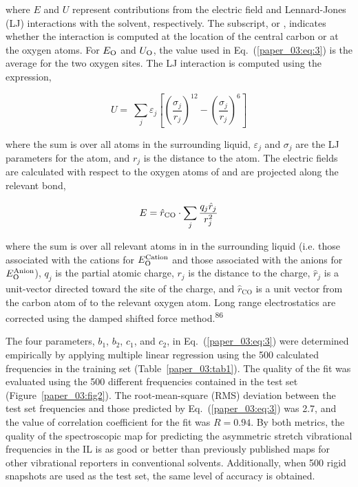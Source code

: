 \documentclass[]{article}
\begin{document}
where \(E\) and \(U\) represent contributions from the electric field and Lennard-Jones (LJ) interactions with the solvent, respectively. The subscript,  or , indicates whether the interaction is computed at the location of the  central carbon or at the oxygen atoms. For \(E_{\ce{O}}\) and \(U_{\ce{O}}\), the value used in Eq.~(\ref{paper_03:eq:3}) is the average for the two  oxygen sites. The LJ interaction is computed using the expression,

\begin{equation}
  \label{paper_03:eq:4}
  U = \ \sum_{j}^{}\varepsilon_{j}\left\lbrack \left( \frac{\sigma_{j}}{r_{j}} \right)^{12} - \left( \frac{\sigma_{j}}{r_{j}} \right)^{6} \right\rbrack
\end{equation}

where the sum is over all atoms in the surrounding liquid, \(\varepsilon_{j}\) and \(\sigma_{j}\) are the LJ parameters for the atom, and \(r_{j}\) is the distance to the atom. The electric fields are calculated with respect to the oxygen atoms of  and are projected along the relevant  bond,

\begin{equation}
  \label{paper_03:eq:5}
  E = {\hat{r}}_{\ce{CO}} \cdot \sum_{j}^{}\frac{q_{j}{\hat{r}}_{j}}{r_{j}^{2}}
\end{equation}

where the sum is over all relevant atoms in in the surrounding liquid (i.e. those associated with the cations for \(E_{\ce{O}}^{\text{Cation}}\) and those associated with the anions for \(E_{\ce{O}}^{\text{Anion}}\)), \(q_{j}\) is the partial atomic charge, \(r_{j}\) is the distance to the charge, \({\hat{r}}_{j}\) is a unit-vector directed toward the site of the charge, and \({\hat{r}}_{\mathrm{\text{CO}}}\) is a unit vector from the carbon atom of  to the relevant oxygen atom. Long range electrostatics are corrected using the damped shifted force method.\textsuperscript{86}

The four parameters, \(b_{1}\), \(b_{2}\), \(c_{1}\), and \(c_{2}\), in Eq.~(\ref{paper_03:eq:3}) were determined empirically by applying multiple linear regression using the \num{500} calculated frequencies in the training set (Table~\ref{paper_03:tab1}). The quality of the fit was evaluated using the \num{500} different frequencies contained in the test set (Figure~\ref{paper_03:fig2}). The root-mean-square (RMS) deviation between the test set frequencies and those predicted by Eq.~(\ref{paper_03:eq:3}) was \SI{2.7}{\wavenumber}, and the value of correlation coefficient for the fit was \(R = 0.94\). By both metrics, the quality of the spectroscopic map for predicting the  asymmetric stretch vibrational frequencies in the \ce{[C4C1im][PF6]} IL is as good or better than previously published maps for other vibrational reporters in conventional solvents. Additionally, when \num{500} rigid  snapshots are used as the test set, the same level of accuracy is obtained.
\end{document}
